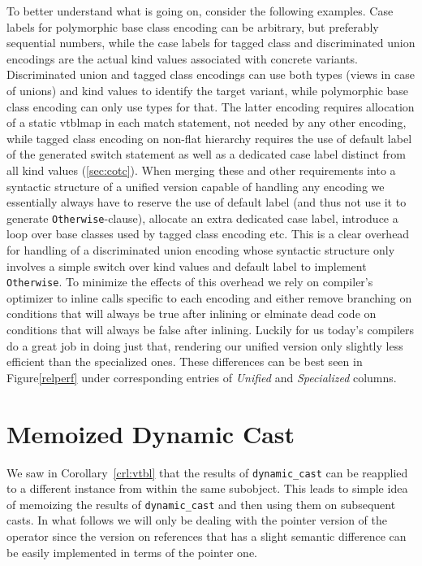 \documentclass[preprint]{sigplanconf}
\makeatletter
\DeclareRobustCommand{\code}[1]{{\lstinline[breaklines=false,escapechar=@]{#1}}}
\makeatother
\begin{document}
To better understand what is going on, consider the following examples. Case 
labels for polymorphic base class encoding can be arbitrary, but preferably 
sequential numbers, while the case labels for tagged class and discriminated 
union encodings are the actual kind values associated with concrete variants.
Discriminated union and tagged class encodings can use both types (views in case
of unions) and kind values to identify the target variant, while polymorphic 
base class encoding can only use types for that. The latter encoding requires 
allocation of a static vtblmap in each match statement, not needed by any other 
encoding, while tagged class encoding on non-flat hierarchy requires the use of 
default label of the generated switch statement as well as a dedicated case 
label distinct from all kind values (\textsection\ref{sec:cotc}). 
When merging these and other requirements into a syntactic structure of a 
unified version capable of handling any encoding we essentially always have to 
reserve the use of default label (and thus not use it to generate 
\code{Otherwise}-clause), allocate an extra dedicated case label, introduce  
a loop over base classes used by tagged class encoding etc. This is a clear 
overhead for handling of a discriminated union encoding whose syntactic 
structure only involves a simple switch over kind values and default label to 
implement \code{Otherwise}. To minimize the effects of this overhead we rely on 
compiler's optimizer to inline calls specific to each encoding and either remove 
branching on conditions that will always be true after inlining or elminate dead 
code on conditions that will always be false after inlining. Luckily for us 
today's compilers do a great job in doing just that, rendering our unified 
version only slightly less efficient than the specialized ones. These 
differences can be best seen in Figure\ref{relperf} under corresponding entries 
of \emph{Unified} and \emph{Specialized} columns.

\section{Memoized Dynamic Cast}
\label{sec:memcast}

We saw in Corollary~\ref{crl:vtbl} that the results of \code{dynamic_cast} can 
be reapplied to a different instance from within the same subobject. This leads 
to simple idea of memoizing the results of \code{dynamic_cast} and then using 
them on subsequent casts. In what follows we will only be dealing with the 
pointer version of the operator since the version on references that has a 
slight semantic difference can be easily implemented in terms of the pointer one.
\end{document}
